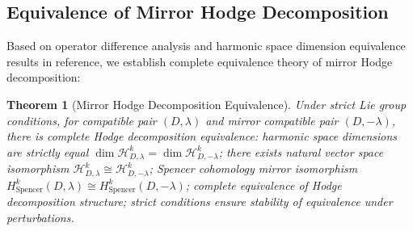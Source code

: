 \documentclass[a4paper,12pt]{extarticle}
\newtheorem{theorem}{Theorem}
\theoremstyle{definition}
\begin{document}
\subsection{Equivalence of Mirror Hodge Decomposition}

Based on operator difference analysis and harmonic space dimension equivalence results in reference\cite{zheng2025mirror}, we establish complete equivalence theory of mirror Hodge decomposition:

\begin{theorem}[Mirror Hodge Decomposition Equivalence]
Under strict Lie group conditions, for compatible pair $(D,\lambda)$ and mirror compatible pair $(D,-\lambda)$, there is complete Hodge decomposition equivalence: harmonic space dimensions are strictly equal $\dim \mathcal{H}^k_{D,\lambda} = \dim \mathcal{H}^k_{D,-\lambda}$; there exists natural vector space isomorphism $\mathcal{H}^k_{D,\lambda} \cong \mathcal{H}^k_{D,-\lambda}$; Spencer cohomology mirror isomorphism $H^k_{\text{Spencer}}(D,\lambda) \cong H^k_{\text{Spencer}}(D,-\lambda)$; complete equivalence of Hodge decomposition structure; strict conditions ensure stability of equivalence under perturbations.
\end{theorem}
\end{document}
